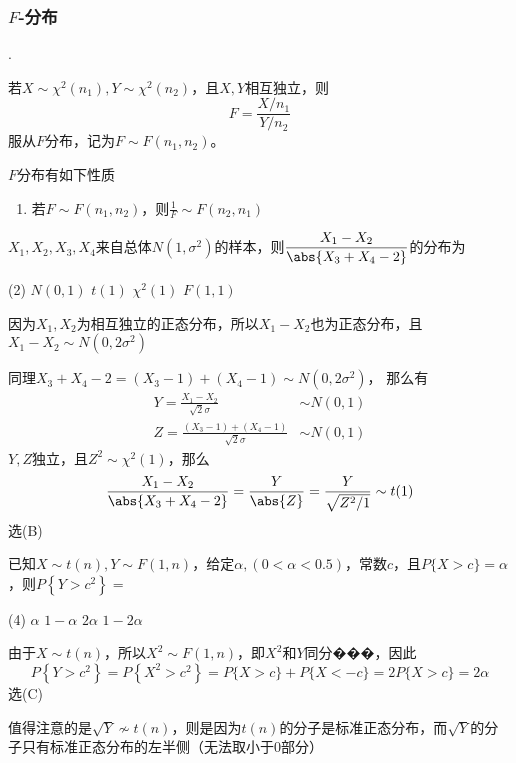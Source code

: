 \subsubsection{\texorpdfstring{$F$}{F}-分布}
.
\begin{definition}
    若$X\sim \chi^2(n_1), Y\sim\chi^2(n_2)$，且$X,Y$相互独立，则
    \[ F=\frac{X/n_1}{Y/n_2} \]
    服从$F$分布，记为$F\sim F(n_1,n_2)$。
\end{definition}
$F$分布有如下性质
\begin{enumerate}
    \item 若$F\sim F(n_1,n_2)$，则$\frac{1}{F} \sim F(n_2,n_1)$
\end{enumerate}


\begin{example}
    $X_1,X_2,X_3,X_4$来自总体$N(1,\sigma^2)$的样本，则$\dfrac{X_1-X_2}{\abs{X_3+X_4-2}}$的分布为
    \begin{tasks}[label=(\Alph*),label-width = 2em](2)
        \task $N(0,1)$
        \task $t(1)$
        \task $\chi^2(1)$
        \task $F(1,1)$
    \end{tasks}
\end{example}
\begin{solution}
    因为$X_1,X_2$为相互独立的正态分布，所以$X_1-X_2$也为正态分布，且$X_1-X_2 \sim N(0,2\sigma^2)$

    同理$X_3+X_4-2 = (X_3-1) + (X_4-1) \sim N(0,2\sigma^2)$，
    那么有
    \begin{align*}
        Y = \frac{X_1-X_2}{\sqrt{2}\sigma}          & \sim N(0,1) \\
        Z =\frac{(X_3-1) + (X_4-1)}{\sqrt{2}\sigma} & \sim N(0,1)
    \end{align*}
    $Y,Z$独立，且$Z^2 \sim \chi^2(1)$，那么
    \[ \frac{X_1-X_2}{\abs{X_3+X_4-2}} = \frac{Y}{\abs{Z}} = \frac{Y}{\sqrt{Z^2/1}} \sim t(1) \]
    选(B)
\end{solution}

\begin{example}
    已知$X\sim t(n), Y\sim F(1,n)$，给定$\alpha, (0<\alpha<0.5)$，常数$c$，且$P\{X>c\}=\alpha$，则$P\left\{Y>c^2\right\}=$
    \begin{tasks}[label=(\Alph*),label-width = 2em](4)
        \task $\alpha$
        \task $1-\alpha$
        \task $2\alpha$
        \task $1-2\alpha$
    \end{tasks}
\end{example}
\begin{solution}
    由于$X\sim t(n)$，所以$X^2 \sim F(1,n)$，即$X^2$和$Y$同分���，因此
    \[ P\left\{ Y > c^2 \right\} = P\left\{ X^2 > c^2 \right\} = P\{ X>c \}+P\{X < -c\} = 2P\{X>c\} = 2\alpha \]
    选(C)

    值得注意的是$\sqrt{Y} \not\sim t(n)$，则是因为$t(n)$的分子是标准正态分布，而$\sqrt{Y}$的分子只有标准正态分布的左半侧（无法取小于$0$部分）
\end{solution}

